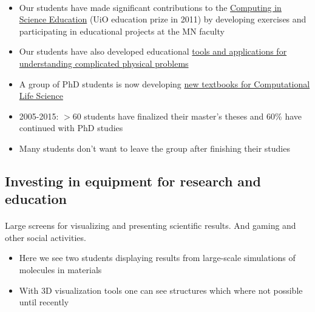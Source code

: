 \documentclass[%
twoside,                 %
final,                   %
10pt]{article}
\begin{document}
\paragraph{}
\begin{itemize}
\item Our students have made significant contributions to  the \href{{http://www.mn.uio.no/english/about/collaboration/cse/}}{Computing in Science Education}  (UiO education prize in 2011) by developing exercises and participating in educational projects at the MN faculty

\item Our students have also developed educational \href{{http://www.mn.uio.no/fysikk/om/aktuelt/aktuelle-saker/2015/realfagsapper.html}}{tools and applications for understanding complicated physical problems}

\item A group of PhD students is now developing \href{{https://github.com/CINPLA/ibvcse}}{new textbooks for Computational Life Science}

\item 2005-2015: $> 60$ students have finalized their master's theses and 60\% have continued with PhD studies

\item Many students don't want to leave the group after finishing their studies
\end{itemize}

\noindent






\subsection{Investing in equipment for research and education}

\paragraph{}
Large screens for visualizing and presenting scientific results. And gaming and other social activities. 
\begin{itemize}
\item Here we see two students displaying results from large-scale simulations of molecules in materials

\item With 3D visualization tools one can see structures which where not possible until recently
\end{itemize}
\end{document}
